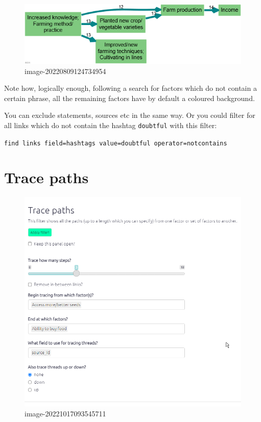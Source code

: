 \documentclass[
]{book}
\begin{document}
\begin{figure}
\centering
\includegraphics[width=6.77083in,height=\textheight]{_assets/image-20220809124734954.png}
\caption{image-20220809124734954}
\end{figure}

Note how, logically enough, following a search for factors which do not contain a certain phrase, all the remaining factors have by default a coloured background.

You can exclude statements, sources etc in the same way. Or you could filter for all links which do not contain the hashtag \texttt{doubtful} with this filter:

\texttt{find\ links\ field=hashtags\ value=doubtful\ operator=notcontains}

\hypertarget{trace-paths}{%
\section{Trace paths}\label{trace-paths}}

\begin{figure}
\centering
\includegraphics{_assets/image-20221017093545711.png}
\caption{image-20221017093545711}
\end{figure}
\end{document}
